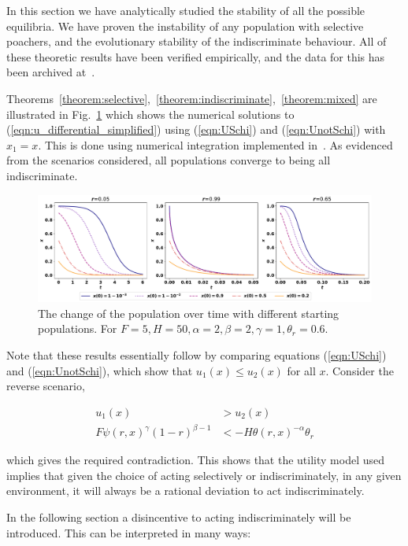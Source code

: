 \documentclass[10pt]{article}
\begin{document}
In this section we have analytically studied the stability of all the possible
equilibria. We have proven the instability of any population with selective
poachers,
and the evolutionary stability of the indiscriminate behaviour.
All of these theoretic results have been verified empirically, and the data for this
has been archived at~\cite{Glynatsi2017}.

Theorems~\ref{theorem:selective},~\ref{theorem:indiscriminate},~\ref{theorem:mixed}
are illustrated in Fig.~\ref{fig:indiscriminate_ess}
which shows the numerical solutions to (\ref{eqn:u_differential_simplified})
using (\ref{eqn:USchi}) and  (\ref{eqn:UnotSchi}) with \(x_1=x\).
This is done using numerical integration implemented  in~\cite{scipy}.
As evidenced from the scenarios considered, all populations converge 
to being all indiscriminate.

\begin{figure}[!htbp]
    \includegraphics[width=\textwidth]{images/IndiscriminateESS.pdf}
    \caption{\label{fig:indiscriminate_ess} The change of the population over
    time with different starting populations. For \(F=5, H=50,
    \alpha=2, \beta=2, \gamma=1, \theta_r=0.6\).}
\end{figure}

Note that these results essentially follow by comparing equations (\ref{eqn:USchi})
and (\ref{eqn:UnotSchi}), which show that \(u_1(x) \leq u_2(x)\) for all \(x\).
Consider the reverse scenario,

\begin{align}
    u_1(x) & > u_2(x)\\ 
    F\psi(r, x) ^ {\gamma} (1 - r) ^ {\beta - 1} & < -H \theta(r, x) ^ {-\alpha} \theta_r
\end{align}

\noindent which gives the required contradiction. This shows that the utility model used
implies that given the choice of acting selectively or indiscriminately, in any
given environment, it will always be a rational deviation to act
indiscriminately.

In the following section a disincentive to acting indiscriminately will be
introduced. This can be interpreted in many ways:
\end{document}
